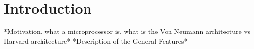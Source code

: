 \section{Introduction} \label{sec:intro}
*Motivation, what a microprocessor is, what is the Von Neumann architecture vs Harvard architecture*
*Description of the General Features*